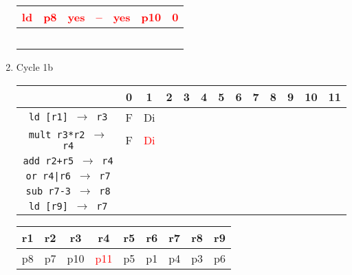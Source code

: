 \documentclass[12pt]{article}
\begin{document}
\begin{enumerate}
\begin{table}[H]
\begin{tabular}{|c|c|c|c|c|c|c|}
					\hline
					\textcolor{red}{ld} & \textcolor{red}{p8} & \textcolor{red}{yes} & \textcolor{red}{--} & \textcolor{red}{yes} & \textcolor{red}{p10} & \textcolor{red}{0}\\
					\hline
					 &  &  &  &  &  & \\
					\hline
					 &  &  &  &  &  & \\
					\hline
					 &  &  &  &  &  & \\
					\hline
					 &  &  &  &  &  & \\
					\hline
					 &  &  &  &  &  & \\
					\hline
				\end{tabular}
			\end{table}
		\item
			Cycle 1b
			\begin{table}[H]
				\begin{tabular}{|c|c|c|c|c|c|c|c|c|c|c|c|c|}
					\hline
					 & 0 & 1 & 2 & 3 & 4 & 5 & 6 & 7 & 8 & 9 & 10 & 11\\
					\hline
					\texttt{ld [r1] $\rightarrow$ r3} & F & Di &  &  &  &  &  &  &  &  &  &\\
					\hline
					\texttt{mult r3*r2 $\rightarrow$ r4} & F & \textcolor{red}{Di} &  &  &  &  &  &  &  &  &  &\\
					\hline
					\texttt{add r2+r5 $\rightarrow$ r4} &  &  &  &  &  &  &  &  &  &  &  &\\
					\hline
					\texttt{or r4|r6 $\rightarrow$ r7} &  &  &  &  &  &  &  &  &  &  &  &\\
					\hline
					\texttt{sub r7-3 $\rightarrow$ r8} &  &  &  &  &  &  &  &  &  &  &  &\\
					\hline
					\texttt{ld [r9] $\rightarrow$ r7} &  &  &  &  &  &  &  &  &  &  &  &\\
					\hline 
				\end{tabular}
			\end{table}
			\begin{table}[H]
				\begin{tabular}{|c|c|c|c|c|c|c|c|c|}
					\hline
					r1 & r2 & r3 & r4 & r5 & r6 & r7 & r8 & r9\\
					\hline
					p8 & p7 & p10 & \textcolor{red}{p11} & p5 & p1 & p4 & p3 & p6\\
					\hline
				\end{tabular}
			\end{table}
			\begin{table}[H]
				\begin{tabular}{|c|c|c|c|c|c|c|c|c|c|c|c|c|c|c|}

\end{tabular}
\end{table}
\end{enumerate}
\end{document}
